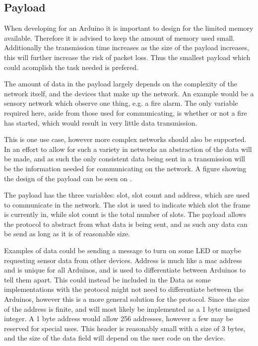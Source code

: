 \subsection{Payload}
When developing for an Arduino it is important to design for the limited memory available.
Therefore it is advised to keep the amount of memory used small.
Additionally the transmission time increases as the size of the payload increases, this will further increase the risk of packet loss. 
Thus the smallest payload which could acomplish the task needed is prefered.

\bigskip 
The amount of data in the payload largely depends on the complexity of the network itself, and the devices that make up the network.
An example would be a sensory network which observe one thing, e.g. a fire alarm. 
The only variable required here, aside from those used for communicating, is whether or not a fire has started, which would result in very little data transmission.

This is one use case, however more complex networks should also be supported. 
In an effort to allow for such a variety in networks an abstraction of the data will be made, and as such the only consistent data being sent in a transmission will be the information needed for communicating on the network.
A figure showing the design of the payload can be seen on .


The payload has the three variables: slot, slot count and address, which are used to communicate in the network.
The slot is used to indicate which slot the frame is currently in, while slot count is the total number of slots.
The payload allows the protocol to abstract from what data is being sent, and as such any data can be send as long as it is of reasonable size. 

Examples of data could be sending a message to turn on some LED or maybe requesting sensor data from other devices.
Address is much like a mac address and is unique for all Arduinos, and is used to differentiate between Arduinos to tell them apart.
This could instead be included in the Data as some implementations with the protocol might not need to differentiate between the Arduinos, however this is a more general solution for the protocol.
Since the size of the address is finite, and will most likely be implemented as a 1 byte unsigned integer. 
A 1 byte address would allow 256 addresses, however a few may be reserved for special uses.
This header is reasonably small with a size of 3 bytes, and the size of the data field will depend on the user code on the device.
